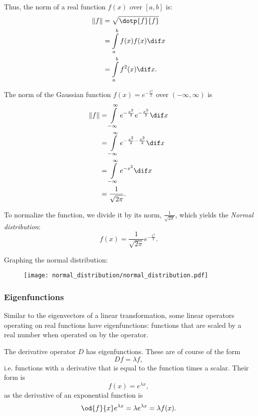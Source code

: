 Thus, the norm of a real function $f(x)$ over $\left[ a,b \right]$ is:
\begin{align*}
  \left\|f\right\| &= \sqrt{\dotp{f}{f}}\\
  &= \int\limits_{a}^{b}f(x)f(x)\dif x\\
  &= \int\limits_{a}^{b}f^{2}(x)\dif x.
\end{align*}

\begin{example}
  The norm of the Gaussian function $f(x)=e^{-\frac{x^{2}}{2}}$ over $\left( -\infty, \infty \right)$ is
  \begin{align*}
    \left\| f \right\| &= \int\limits_{-\infty}^{\infty}e^{-\frac{x^{2}}{2}}e^{-\frac{x^{2}}{2}}\dif x\\
    &= \int\limits_{-\infty}^{\infty}e^{-\frac{x^{2}}{2}-\frac{x^{2}}{2}}\dif x\\
    &= \int\limits_{-\infty}^{\infty}e^{-x^{2}}\dif x\\
    &= \frac{1}{\sqrt{2\pi}}.
  \end{align*}

  To normalize the function, we divide it by its norm, $\frac{1}{\sqrt{2\pi}}$, which yields the \emph{Normal distribution}:
  \begin{equation*}
    f(x) = \frac{1}{\sqrt{2\pi}}e^{-\frac{x^{2}}{2}}.
  \end{equation*}
  
  Graphing the normal distribution:
  \begin{figure}[H]
    \centering
    \texttt{[image: normal\_distribution/normal\_distribution.pdf]}
  \end{figure}
\end{example}

\subsubsection{Eigenfunctions}
Similar to the eigenvectors of a linear transformation, some linear operators operating on real functions have eigenfunctions: functions that are scaled by a real number when operated on by the operator.
\begin{example}
  The derivative operator $D$ has eigenfunctions. These are of course of the form
  \begin{equation*}
    Df = \lambda f,
  \end{equation*}
  i.e. functions with a derivative that is equal to the function times a scalar. Their form is
  \begin{equation*}
    f(x) = e^{\lambda x},
  \end{equation*}
  as the derivative of an exponential function is
  \begin{equation*}
    \od{f}{x}e^{\lambda x} = \lambda e^{\lambda x} = \lambda f(x).
  \end{equation*}
\end{example}
